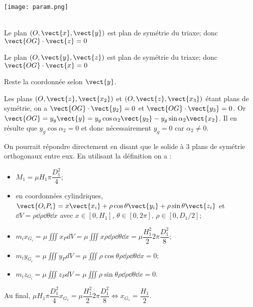 \begin{center}
\texttt{[image: param.png]}
\end{center}
\ifprof
\begin{corrige} ~\\

Le plan $\left(O,\vect{x},\vect{y}\right)$ est plan de symétrie du triaxe; donc $\vect{OG}\cdot\vect{z} =0$

Le plan $\left(O,\vect{y},\vect{z}\right)$ est plan de symétrie du triaxe; donc $\vect{OG}\cdot\vect{x} =0$

Reste la coordonnée selon $\vect{y}$. 

Les plans $\left(O,\vect{z},\vect{x_2}\right)$ et $\left(O,\vect{z},\vect{x_3}\right)$ étant plans de symétrie, on a 
 $\vect{OG}\cdot\vect{y_2} =0$ et  $\vect{OG}\cdot\vect{y_3} =0$. 
 Or $\vect{OG}= y_g \vect{y} =  y_g \cos \alpha_2 \vect{y_2} - y_g \sin \alpha_2 \vect{x_2}$. Il en résulte que   $y_g \cos \alpha_2 = 0$ et donc nécessairement $y_g=0$ car $\alpha_2\neq 0$. 
\end{corrige}
\else
\fi



\ifprof
\begin{corrige}
On pourrait répondre directement en disant que le solide à 3 plans de symétrie orthogonaux entre eux. 
En utilisant la définition on a :
\begin{itemize}
\item $M_1 =\mu H_1\pi \dfrac{D_1^2}{4}$;
\item en coordonnées cylindriques, $\vect{O_iP_i}=x\vect{x_i}+ \rho \cos\theta \vect{y_i}+\rho \sin\theta \vect{z_i}$ et $\dd V = \rho\dd \rho \dd \theta \dd x$ avec $x\in[0,H_1]$, $\theta\in [0,2\pi]$, $\rho \in \left[0,D_1/2\right]$;
\item $m_ix_{G_i}=\mu \iiint x_P dV = \mu \iiint x  \rho\dd \rho \dd \theta \dd x= \mu \dfrac{H_1^2}{2} 2\pi \dfrac{D_1^2}{8}$;
\item $m_iy_{G_i}=\mu \iiint y_P dV = \mu \iiint \rho \cos\theta   \rho\dd \rho \dd \theta \dd x=0$;
\item $m_iz_{G_i}=\mu \iiint z_P dV = \mu \iiint \rho \sin\theta  \rho\dd \rho \dd \theta \dd x=0$. 
\end{itemize}
Au final,  $\mu H_1\pi  \dfrac{D_1^2}{4}x_{G_1}=\mu \dfrac{H_1^2}{2}  2\pi  \dfrac{D_1^2}{8} \Leftrightarrow   x_{G_1}= \dfrac{H_1}{2}$.
\end{corrige}
\else
\fi


